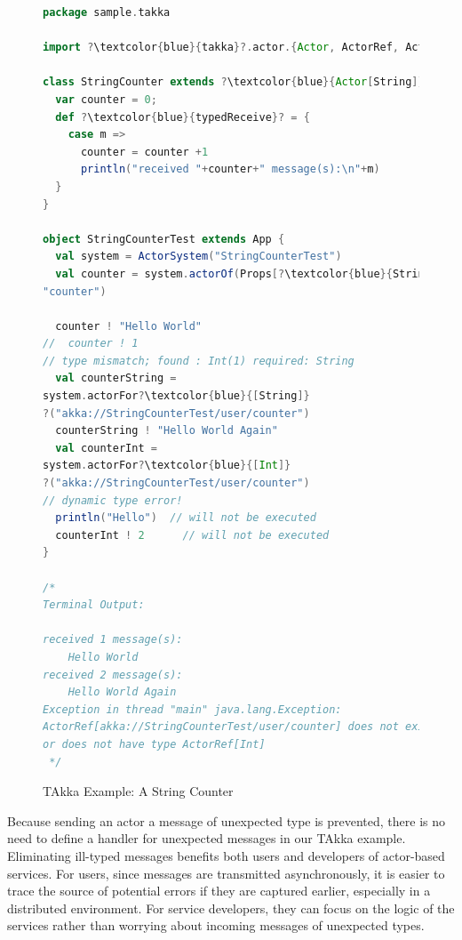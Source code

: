 \begin{figure}
      \begin{lstlisting}[language=scala, escapechar=?]
package sample.takka

import ?\textcolor{blue}{takka}?.actor.{Actor, ActorRef, ActorSystem, Props}

class StringCounter extends ?\textcolor{blue}{Actor[String]}? {
  var counter = 0;
  def ?\textcolor{blue}{typedReceive}? = {
    case m => 
      counter = counter +1
      println("received "+counter+" message(s):\n"+m)
  }
}

object StringCounterTest extends App {
  val system = ActorSystem("StringCounterTest")
  val counter = system.actorOf(Props[?\textcolor{blue}{String}?, StringCounter], 
"counter")
  
  counter ! "Hello World"
//  counter ! 1
// type mismatch; found : Int(1) required: String  
  val counterString = 
system.actorFor?\textcolor{blue}{[String]}
?("akka://StringCounterTest/user/counter")
  counterString ! "Hello World Again"
  val counterInt = 
system.actorFor?\textcolor{blue}{[Int]}
?("akka://StringCounterTest/user/counter")  
// dynamic type error!  
  println("Hello")  // will not be executed
  counterInt ! 2      // will not be executed
}

/*
Terminal Output:

received 1 message(s):
	Hello World
received 2 message(s):
	Hello World Again
Exception in thread "main" java.lang.Exception: 
ActorRef[akka://StringCounterTest/user/counter] does not exist
or does not have type ActorRef[Int]
 */	
    \end{lstlisting}
    \caption{TAkka Example: A String Counter}
    \label{takka_string_counter}
\end{figure}


Because sending an actor a message of unexpected type is prevented,
there is no need to define a handler for unexpected messages in our TAkka
example.  Eliminating ill-typed messages benefits both users and developers
of actor-based services. For users, since messages are transmitted 
asynchronously, it is easier to trace the source of potential errors if they are 
captured earlier, especially in a distributed environment. For service 
developers, they can focus on the logic of the services rather than worrying 
about incoming messages of unexpected types.


